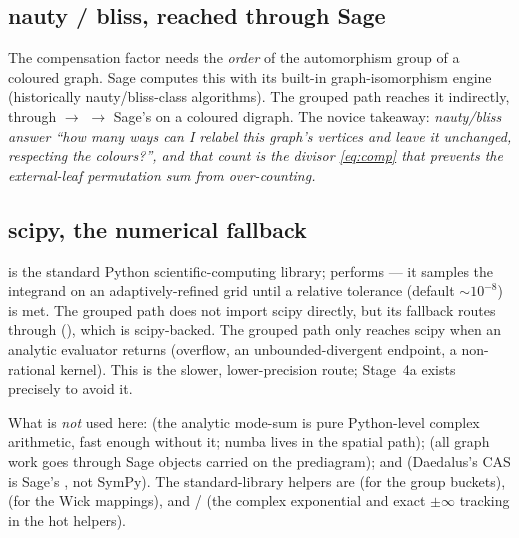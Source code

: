 \subsection{nauty / bliss, reached through Sage}

The compensation factor needs the \emph{order} of the automorphism group of a
coloured graph. Sage computes this with its built-in graph-isomorphism engine
(historically nauty/bliss-class algorithms). The grouped path reaches it
indirectly, through  $\to$
 $\to$ Sage's  on
a coloured digraph. The novice takeaway: \emph{nauty/bliss answer ``how many ways
can I relabel this graph's vertices and leave it unchanged, respecting the
colours?'', and that count is the divisor \eqref{eq:comp} that prevents the
external-leaf permutation sum from over-counting.}

\subsection{scipy, the numerical fallback}

 is the standard Python scientific-computing library;
 performs  --- it samples the integrand on an adaptively-refined grid until a
relative tolerance (default $\sim\!10^{-8}$) is met. The grouped path does not
import scipy directly, but its fallback routes through 
(), which is scipy-backed. The grouped path only
reaches scipy when an analytic evaluator returns  (overflow, an
unbounded-divergent endpoint, a non-rational kernel). This is the slower,
lower-precision route; Stage~4a exists precisely to avoid it.

\begin{note}
What is \emph{not} used here:  (the analytic mode-sum is pure
Python-level complex arithmetic, fast enough without it; numba lives in the
spatial path);  (all graph work goes through Sage 
objects carried on the prediagram); and  (Daedalus's CAS is Sage's
, not SymPy). The standard-library helpers are  (for
the group buckets),  (for the Wick mappings), and
/ (the complex exponential and exact $\pm\infty$ tracking
in the hot helpers).
\end{note}

